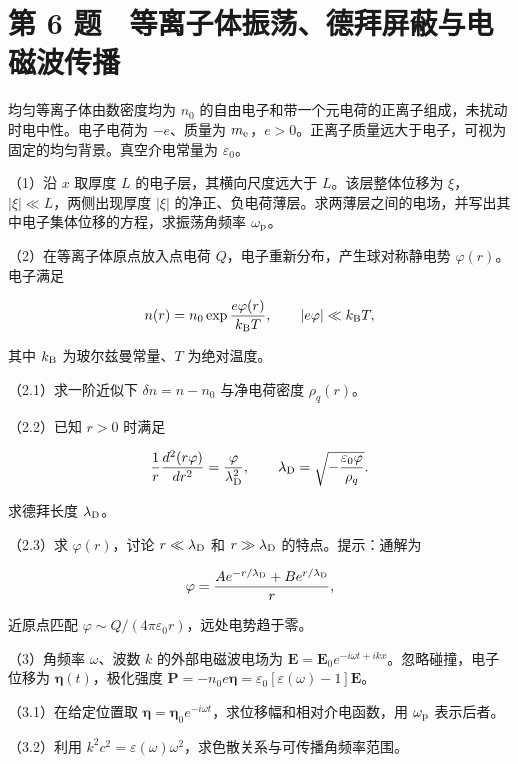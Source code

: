 \documentclass[12pt,a4paper,fontset=fandol]{ctexart}
\begin{document}
\section{第 6
题　等离子体振荡、德拜屏蔽与电磁波传播}\label{ux7b2c-6-ux9898-ux7b49ux79bbux5b50ux4f53ux632fux8361ux5fb7ux62dcux5c4fux853dux4e0eux7535ux78c1ux6ce2ux4f20ux64ad}

均匀等离子体由数密度均为 \(n_0\)
的自由电子和带一个元电荷的正离子组成，未扰动时电中性。电子电荷为
\(-e\)、质量为
\(m_{\rm e}\)，\(e>0\)。正离子质量远大于电子，可视为固定的均匀背景。真空介电常量为
\(\varepsilon_0\)。

（1）沿 \(x\) 取厚度 \(L\) 的电子层，其横向尺度远大于
\(L\)。该层整体位移为 \(\xi\)，\(|\xi|\ll L\)，两侧出现厚度 \(|\xi|\)
的净正、负电荷薄层。求两薄层之间的电场，并写出其中电子集体位移的方程，求振荡角频率
\(\omega_{\rm p}\)。

（2）在等离子体原点放入点电荷 \(Q\)，电子重新分布，产生球对称静电势
\(\varphi(r)\)。电子满足

\[
n(r)=n_0\exp\frac{e\varphi(r)}{k_{\rm B}T},\qquad
|e\varphi|\ll k_{\rm B}T,
\]

其中 \(k_{\rm B}\) 为玻尔兹曼常量、\(T\) 为绝对温度。

（2.1）求一阶近似下 \(\delta n=n-n_0\) 与净电荷密度 \(\rho_q(r)\)。

（2.2）已知 \(r>0\) 时满足

\[
\frac1r\frac{d^2(r\varphi)}{dr^2}=\frac{\varphi}{\lambda_{\rm D}^2},
\qquad \lambda_{\rm D}=\sqrt{-\frac{\varepsilon_0\varphi}{\rho_q}}.
\]

求德拜长度 \(\lambda_{\rm D}\)。

（2.3）求 \(\varphi(r)\)，讨论 \(r\ll\lambda_{\rm D}\) 和
\(r\gg\lambda_{\rm D}\) 的特点。提示：通解为

\[
\varphi=\frac{Ae^{-r/\lambda_{\rm D}}+Be^{r/\lambda_{\rm D}}}{r},
\]

近原点匹配 \(\varphi\sim Q/(4\pi\varepsilon_0r)\)，远处电势趋于零。

（3）角频率 \(\omega\)、波数 \(k\) 的外部电磁波电场为
\(\boldsymbol E=\boldsymbol E_0e^{-i\omega t+ikx}\)。忽略碰撞，电子位移为
\(\boldsymbol\eta(t)\)，极化强度
\(\boldsymbol P=-n_0e\boldsymbol\eta=\varepsilon_0[\varepsilon(\omega)-1]\boldsymbol E\)。

（3.1）在给定位置取
\(\boldsymbol\eta=\boldsymbol\eta_0e^{-i\omega t}\)，求位移幅和相对介电函数，用
\(\omega_{\rm p}\) 表示后者。

（3.2）利用
\(k^2c^2=\varepsilon(\omega)\omega^2\)，求色散关系与可传播角频率范围。
\end{document}
